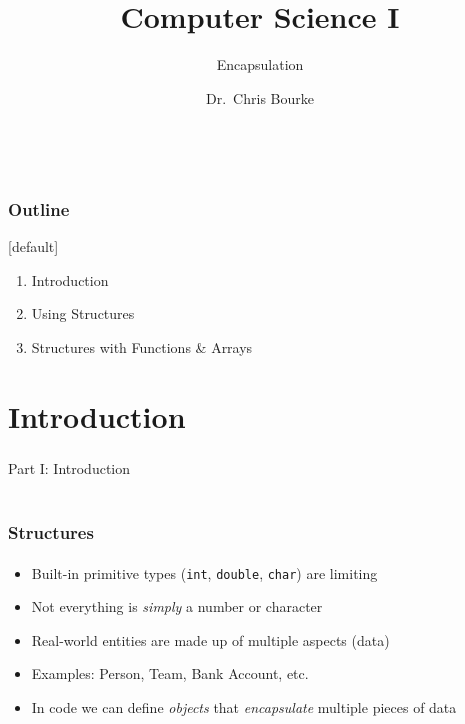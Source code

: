 \documentclass[]{beamer}
\title[~]{Computer Science I}
\subtitle{Encapsulation}
\author[~]{Dr.\ Chris Bourke\\ \email{cbourke@cse.unl.edu}} %
\date{~}
\begin{document}
\begin{frame}
  \titlepage
\end{frame}


\begin{frame}
  \frametitle{Outline}

[default]
\begin{enumerate}
  \item Introduction
  \item Using Structures
  \item Structures with Functions \& Arrays

\end{enumerate}

\end{frame}

\section{Introduction}

\begin{frame}
    \frametitle{}
    \framesubtitle{}
    
    \begin{center}
    {\Huge Part I: Introduction}\\
    {\Large ~}
    \end{center}

\end{frame}

\begin{frame}[fragile]
  \frametitle{Structures}
  \framesubtitle{}

\begin{itemize}[<+->]
  \item Built-in primitive types (\texttt{int}, 
  \texttt{double}, \texttt{char}) are limiting
  \item Not everything is \emph{simply} a number or character
  \item Real-world entities are made up of multiple aspects (data)
  \item Examples: Person, Team, Bank Account, etc.
  \item In code we can define \emph{objects} that \emph{encapsulate}
  multiple pieces of data
\end{itemize}

\end{frame}
\end{document}
